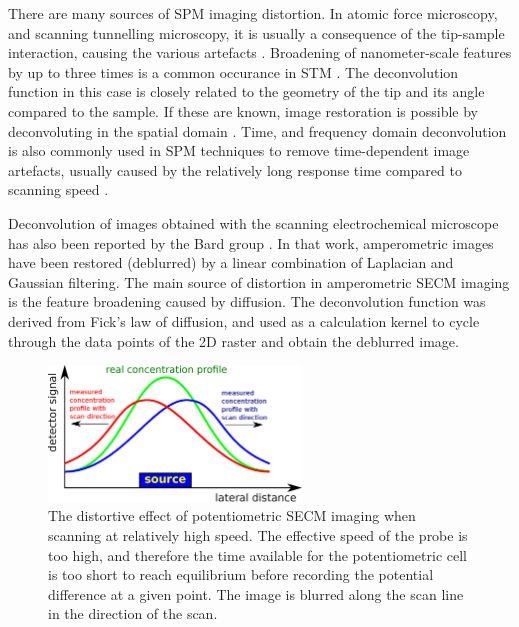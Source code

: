 There are many sources of SPM imaging distortion.
In atomic force microscopy, and scanning tunnelling microscopy, it is usually a consequence of the tip-sample interaction, causing the various artefacts \cite{peter2010atomic}.
Broadening of nanometer-scale features by up to three times is a common occurance in STM \cite{lo1993investigation}.
The deconvolution function in this case is closely related to the geometry of the tip and its angle compared to the sample.
If these are known, image restoration is possible by deconvoluting in the spatial domain \cite{chen2006deconvolution, osiro2012measuring, bukharaev1998three}.
Time, and frequency domain deconvolution is also commonly used in SPM techniques to remove time-dependent image artefacts, usually caused by the relatively long response time compared to scanning speed \cite{robinson1988increasing}.


Deconvolution of images obtained with the scanning electrochemical microscope has also been reported by the Bard group \cite{lee1991scanning}.
In that work, amperometric images have been restored (deblurred) by a linear combination of Laplacian and Gaussian filtering.
The main source of distortion in amperometric SECM imaging is the feature broadening caused by diffusion.
The deconvolution function was derived from Fick's law of diffusion, and used as a calculation kernel to cycle through the data points of the 2D raster and obtain the deblurred image.

\begin{figure}
\centering
\includegraphics[width=0.6\textwidth]{img/theory/distortion3.eps}
\caption[The distortive effect of potentiometric SECM imaging.]{The distortive effect of potentiometric SECM imaging when scanning at relatively high speed.
The effective speed of the probe is too high, and therefore the time available for the potentiometric cell is too short to reach equilibrium before recording the potential difference at a given point.
The image is blurred along the scan line in the direction of the scan.}
\label{fig:distortion}
\end{figure}
